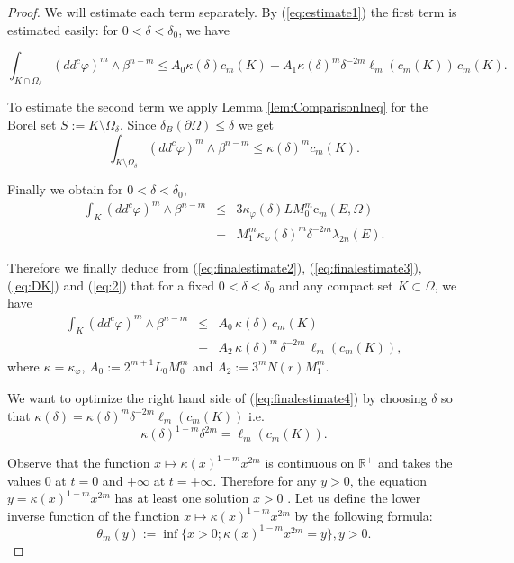 \documentclass[12pt]{amsart}
\theoremstyle{definition}
\numberwithin{theorem}{section}
\numberwithin{equation}{section}
\newcommand{\R}{\mathbb{R}}
\begin{document}
{\begin{proof}
We will estimate each term separately. By (\ref{eq:estimate1}) the first term is estimated easily: for $0 < \delta < \delta_0$, we have

\begin{equation} \label{eq:estimate2}
\int_{K \cap \Omega_\delta} (dd^c\varphi)^m\wedge\beta^{n-m}  \leq A_0 \kappa (\delta) c_m (K) +  A_1  \kappa (\delta)^m \delta^{-2m}   \ell_m (c_m (K)) \,  c_m (K).
\end{equation} 

To estimate the second term we apply Lemma \ref{lem:ComparisonIneq} for the Borel set $ S := K \setminus \Omega_\delta$. Since $\delta_B (\partial \Omega) \leq \delta$ we get
$$
\int_{K \setminus \Omega_\delta} (dd^c\varphi)^m\wedge\beta^{n-m}  \leq \kappa (\delta)^{m} c_m (K).
$$

Finally we obtain for $0 < \delta < \delta_0$, 
\begin{eqnarray} \label{eq:finalestimate3}
\int_{K}(dd^c\varphi)^m\wedge\beta^{n-m}  &\leq &  3 \kappa_\varphi(\delta) L M_0^m  \text{c}_m (E,\Omega)\\
&+& M_1^{m} \kappa_\varphi (\delta)^m \delta^{-2 m} \lambda_{2 n} (E). \nonumber
\end{eqnarray} 

Therefore we finally deduce from (\ref{eq:finalestimate2}), (\ref{eq:finalestimate3}), (\ref{eq:DK}) and  (\ref{eq:2}) that  for a fixed $0 < \delta < \delta_0$ and any compact set $K \subset \Omega$,  we have 
\begin{eqnarray}\label{eq:finalestimate4}
\int_K (dd^c\varphi)^m\wedge\beta^{n-m} & \leq & A_0 \, \kappa(\delta) \,   c_m (K)\\
&  + &  A_2 \,  \kappa (\delta)^{m}  \, \delta^{-2m} \,  \ell_m (c_m (K)), \nonumber
\end{eqnarray} 
where $\kappa = \kappa_\varphi$,  $A_0 :=  2^{m + 1}  L_0 M_0^m$ and $A_2 :=  3^m N (r)  M_1^{m}   $.


We want to optimize the right hand side of (\ref{eq:finalestimate4}) by choosing  $\delta $ so that $\kappa(\delta)  = \kappa (\delta)^{m} \delta^{-2m} \ell_m (c_m (K)) $ i.e. 
$$
\kappa (\delta)^{1-m} \delta^{2 m}  = \ell_m (c_m (K)).
$$

Observe that the function $x \longmapsto \kappa (x)^{1-m}  x^{2 m}$ is continuous on $\R^+$ and takes the values $0$ at $t=0$ and $+ \infty$ at $ t = +\infty$. Therefore for any $y > 0$, the equation $y = \kappa (x)^{1-m}  x^{2 m}$ has at least one solution $x >0$ . Let us define  
the lower inverse function of the function $x \longmapsto \kappa (x)^{1-m}  x^{2 m}$ by  the following formula:
 \begin{equation} \label{eq:lowerinverse}
 \theta_m (y) :=  \inf \{x > 0 ;  \kappa (x)^{1-m}  x^{2 m} = y \}, y > 0.
 \end{equation}
 

\end{proof}}
\end{document}
